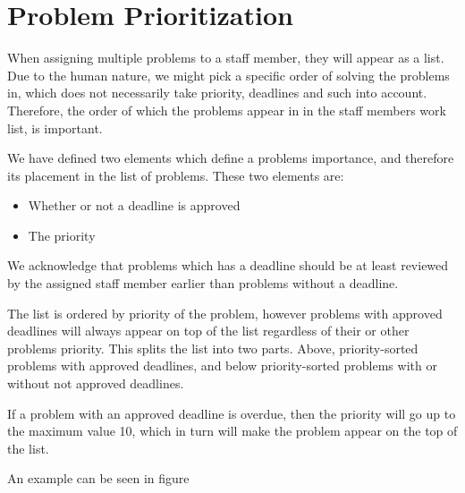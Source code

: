 \section{Problem Prioritization}
\label{sec:problem_priority}

When assigning multiple problems to a staff member, they will appear as a list. 
Due to the human nature, we might pick a specific order of solving the problems in, which does not necessarily take priority, deadlines and such into account. 
Therefore, the order of which the problems appear in in the staff members work list, is important.

We have defined two elements which define a problems importance, and therefore its placement in the list of problems. 
These two elements are:

\begin{itemize}
	\item Whether or not a deadline is approved
	\item The priority
\end{itemize}

We acknowledge that problems which has a deadline should be at least reviewed by the assigned staff member earlier than problems without a deadline.

The list is ordered by priority of the problem, however problems with approved deadlines will always appear on top of the list regardless of their or other problems priority. 
This splits the list into two parts. Above, priority-sorted problems with approved deadlines, and below priority-sorted problems with or without not approved deadlines. 

If a problem with an approved deadline is overdue, then the priority will go up to the maximum value 10, which in turn will make the problem appear on the top of the list.

An example can be seen in figure  